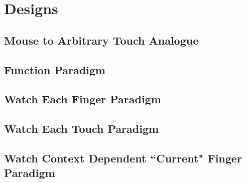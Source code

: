 \chapter{Designs}

\section{Mouse to Arbitrary Touch Analogue}
\section{Function Paradigm}
\section{Watch Each Finger Paradigm}
\section{Watch Each Touch Paradigm}
\section{Watch Context Dependent ``Current" Finger Paradigm}



